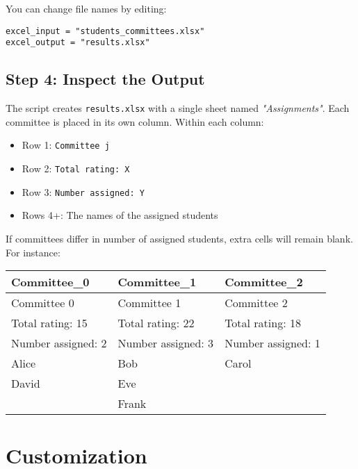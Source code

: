 \documentclass[12pt]{article}
\begin{document}
You can change file names by editing:

\begin{verbatim}
excel_input = "students_committees.xlsx"
excel_output = "results.xlsx"
\end{verbatim}

\subsection{Step 4: Inspect the Output}

The script creates \texttt{results.xlsx} with a single sheet named \emph{"Assignments"}.
Each committee is placed in its own column. Within each column:

\begin{itemize}
    \item Row 1: \texttt{Committee j}
    \item Row 2: \texttt{Total rating: X}
    \item Row 3: \texttt{Number assigned: Y}
    \item Rows 4+: The names of the assigned students
\end{itemize}

If committees differ in number of assigned students, extra cells will remain blank.
For instance:

\begin{center}
    \begin{tabular}{lll}
        \textbf{Committee\_0} & \textbf{Committee\_1} & \textbf{Committee\_2} \\
        \hline
        Committee 0           & Committee 1           & Committee 2           \\
        Total rating: 15      & Total rating: 22      & Total rating: 18      \\
        Number assigned: 2    & Number assigned: 3    & Number assigned: 1    \\
        Alice                 & Bob                   & Carol                 \\
        David                 & Eve                   &                       \\
                              & Frank                 &                       \\
    \end{tabular}
\end{center}

\section{Customization}
\end{document}
